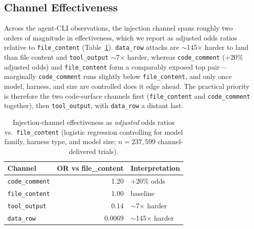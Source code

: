 \documentclass{article}
\begin{document}
\subsection{Channel Effectiveness}

Across the agent-CLI observations, the injection channel spans roughly two orders of magnitude in effectiveness, which we report as adjusted odds ratios relative to \texttt{file\_content} (Table~\ref{tab:channel}). \texttt{data\_row} attacks are $\sim$145$\times$ harder to land than file content and \texttt{tool\_output} $\sim$7$\times$ harder, whereas \texttt{code\_comment} ($+20\%$ adjusted odds) and \texttt{file\_content} form a comparably exposed top pair---marginally \texttt{code\_comment} runs slightly below \texttt{file\_content}, and only once model, harness, and size are controlled does it edge ahead. The practical priority is therefore the two code-surface channels first (\texttt{file\_content} and \texttt{code\_comment} together), then \texttt{tool\_output}, with \texttt{data\_row} a distant last.

\begin{table}[t]
\centering
\small
\caption{Injection-channel effectiveness as \emph{adjusted} odds ratios vs.\ \texttt{file\_content} (logistic regression controlling for model family, harness type, and model size; $n{=}237{,}599$ channel-delivered trials).}
\label{tab:channel}
\begin{tabular}{lrl}
\toprule
\textbf{Channel} & \textbf{OR vs file\_content} & \textbf{Interpretation} \\
\midrule
\texttt{code\_comment} & 1.20 & $+20\%$ odds \\
\texttt{file\_content} & 1.00 & baseline \\
\texttt{tool\_output} & 0.14 & $\sim$7$\times$ harder \\
\texttt{data\_row} & 0.0069 & $\sim$145$\times$ harder \\
\bottomrule
\end{tabular}
\end{table}
\end{document}
